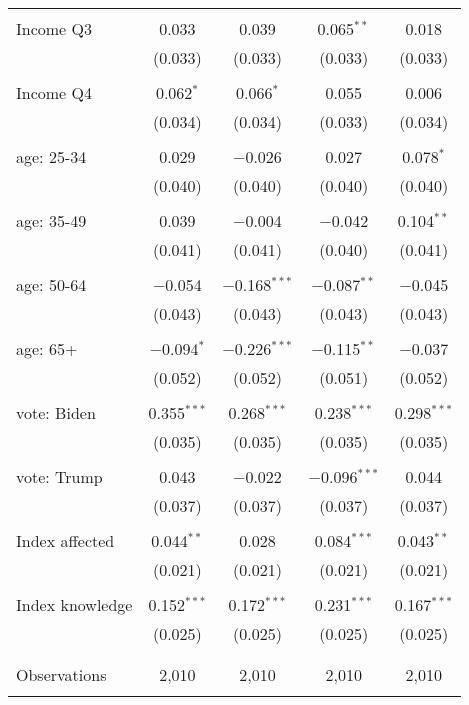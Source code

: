 \begin{tabular}{@{\extracolsep{5pt}}lcccc}
  & & & & \\ 
 Income Q3 & 0.033 & 0.039 & 0.065$^{**}$ & 0.018 \\ 
  & (0.033) & (0.033) & (0.033) & (0.033) \\ 
  & & & & \\ 
 Income Q4 & 0.062$^{*}$ & 0.066$^{*}$ & 0.055 & 0.006 \\ 
  & (0.034) & (0.034) & (0.033) & (0.034) \\ 
  & & & & \\ 
 age: 25-34 & 0.029 & $-$0.026 & 0.027 & 0.078$^{*}$ \\ 
  & (0.040) & (0.040) & (0.040) & (0.040) \\ 
  & & & & \\ 
 age: 35-49 & 0.039 & $-$0.004 & $-$0.042 & 0.104$^{**}$ \\ 
  & (0.041) & (0.041) & (0.040) & (0.041) \\ 
  & & & & \\ 
 age: 50-64 & $-$0.054 & $-$0.168$^{***}$ & $-$0.087$^{**}$ & $-$0.045 \\ 
  & (0.043) & (0.043) & (0.043) & (0.043) \\ 
  & & & & \\ 
 age: 65+ & $-$0.094$^{*}$ & $-$0.226$^{***}$ & $-$0.115$^{**}$ & $-$0.037 \\ 
  & (0.052) & (0.052) & (0.051) & (0.052) \\ 
  & & & & \\ 
 vote: Biden & 0.355$^{***}$ & 0.268$^{***}$ & 0.238$^{***}$ & 0.298$^{***}$ \\ 
  & (0.035) & (0.035) & (0.035) & (0.035) \\ 
  & & & & \\ 
 vote: Trump & 0.043 & $-$0.022 & $-$0.096$^{***}$ & 0.044 \\ 
  & (0.037) & (0.037) & (0.037) & (0.037) \\ 
  & & & & \\ 
 Index affected & 0.044$^{**}$ & 0.028 & 0.084$^{***}$ & 0.043$^{**}$ \\ 
  & (0.021) & (0.021) & (0.021) & (0.021) \\ 
  & & & & \\ 
 Index knowledge & 0.152$^{***}$ & 0.172$^{***}$ & 0.231$^{***}$ & 0.167$^{***}$ \\ 
  & (0.025) & (0.025) & (0.025) & (0.025) \\ 
  & & & & \\ 
\hline \\[-1.8ex] 

Observations & 2,010 & 2,010 & 2,010 & 2,010 \\ 
\hline 
\hline \\[-1.8ex] 
\end{tabular} 